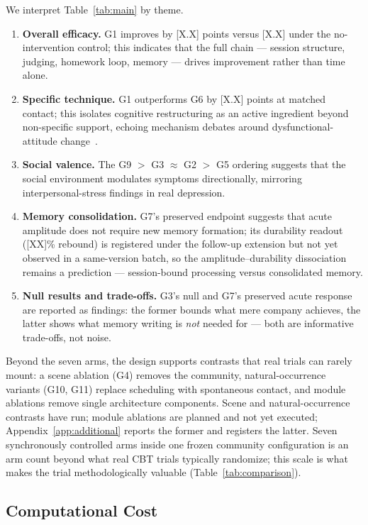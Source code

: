 \documentclass[10pt]{article}
\begin{document}
We interpret Table~\ref{tab:main} by theme.
\begin{enumerate}
\item \textbf{Overall efficacy.} G1 improves by [X.X] points versus [X.X] under the no-intervention control; this indicates that the full chain --- session structure, judging, homework loop, memory --- drives improvement rather than time alone.
\item \textbf{Specific technique.} G1 outperforms G6 by [X.X] points at matched contact; this isolates cognitive restructuring as an active ingredient beyond non-specific support, echoing mechanism debates around dysfunctional-attitude change~\citep{burns2001,lambert1992}.
\item \textbf{Social valence.} The G9 $>$ G3 $\approx$ G2 $>$ G5 ordering suggests that the social environment modulates symptoms directionally, mirroring interpersonal-stress findings in real depression.
\item \textbf{Memory consolidation.} G7's preserved endpoint suggests that acute amplitude does not require new memory formation; its durability readout ([XX]\% rebound) is registered under the follow-up extension but not yet observed in a same-version batch, so the amplitude--durability dissociation remains a prediction --- session-bound processing versus consolidated memory.
\item \textbf{Null results and trade-offs.} G3's null and G7's preserved acute response are reported as findings: the former bounds what mere company achieves, the latter shows what memory writing is \emph{not} needed for --- both are informative trade-offs, not noise.
\end{enumerate}

Beyond the seven arms, the design supports contrasts that real trials can rarely mount: a scene ablation (G4) removes the community, natural-occurrence variants (G10, G11) replace scheduling with spontaneous contact, and module ablations remove single architecture components.
Scene and natural-occurrence contrasts have run; module ablations are planned and not yet executed; Appendix~\ref{app:additional} reports the former and registers the latter.
Seven synchronously controlled arms inside one frozen community configuration is an arm count beyond what real CBT trials typically randomize; this scale is what makes the trial methodologically valuable (Table~\ref{tab:comparison}).

\subsection{Computational Cost}\label{sec:cost}
\end{document}
